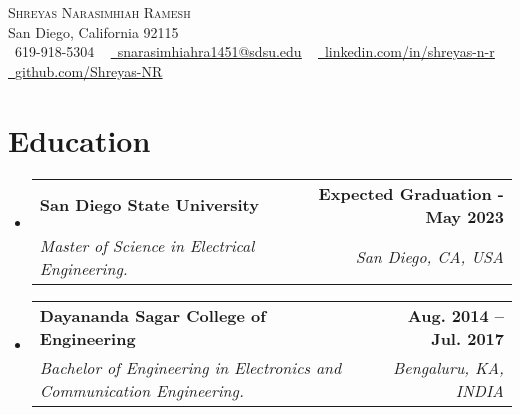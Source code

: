 \documentclass[letterpaper,11pt]{article}
\makeatletter
\newcommand{\resumeSubheading}[4]{
  \vspace{-5pt}\item
    \begin{tabular*}{1.0\textwidth}[t]{l@{\extracolsep{\fill}}r}
      \textbf{#1} & \textbf{\small #2} \\
      \textit{\small#3} & \textit{\small #4} \\
    \end{tabular*}\vspace{-7pt}
}
\newcommand{\resumeSubHeadingListStart}{\begin{itemize}[leftmargin=0.0in, label={}]}
\newcommand{\resumeSubHeadingListEnd}{\end{itemize}}
\makeatother
\begin{document}

\begin{center}
    {\Huge \scshape Shreyas Narasimhiah Ramesh} \\ \vspace{1pt}
    San Diego, California 92115 \\ \vspace{1pt}
    \small \raisebox{-0.1\height}\faPhone\ 619-918-5304 ~ \href{mailto:snarasimhiahra1451@sdsu.edu}{\raisebox{-0.2\height}\faEnvelope\  \underline{snarasimhiahra1451@sdsu.edu}} ~ 
    \href{https:www.linkedin.com/in/shreyas-n-r}{\raisebox{-0.2\height}\faLinkedin\ \underline{linkedin.com/in/shreyas-n-r}}  ~
    \href{https://github.com/}{\raisebox{-0.2\height}\faGithub\ \underline{github.com/Shreyas-NR}}
    \vspace{-8pt}
\end{center}


\section{Education}
  \resumeSubHeadingListStart
    \resumeSubheading
      {San Diego State University}{Expected Graduation - May 2023}
      {Master of Science in Electrical Engineering.}{San Diego, CA, USA}
  \resumeSubHeadingListEnd
  \resumeSubHeadingListStart
    \resumeSubheading
      {Dayananda Sagar College of Engineering}{Aug. 2014 -- Jul. 2017}
      {Bachelor of Engineering in Electronics and Communication Engineering.}{Bengaluru, KA, INDIA}
  \resumeSubHeadingListEnd
\end{document}
